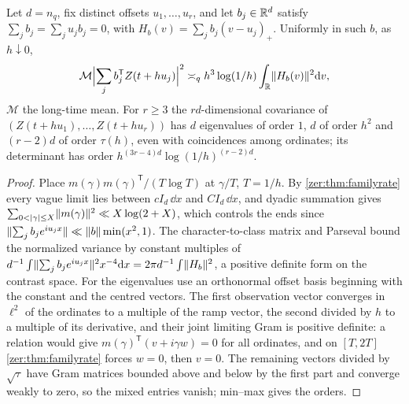 \begin{corollary}\label{zer:cor:classorders}
Let $d=n_q$, fix distinct offsets $u_1,\dots,u_r$, and let $b_j\in\mathbb{R}^d$ satisfy $\sum_jb_j=\sum_ju_jb_j=0$,
with $H_b(v)=\sum_jb_j(v-u_j)_+$. Uniformly in such $b$, as $h\downarrow0$,
\[
 \mathcal M\Bigl\lvert\sum_jb_j^{\mathsf T}Z(t+hu_j)\Bigr\rvert^2\asymp_q h^3\log(1/h)\int_{\mathbb{R}}\lVert H_b(v)\rVert^2\mathrm{d} v ,
\]
$\mathcal M$ the long-time mean. For $r\ge3$ the $rd$-dimensional covariance of
$(Z(t+hu_1),\dots,Z(t+hu_r))$ has $d$ eigenvalues of order $1$, $d$ of order $h^2$ and $(r-2)d$ of order
$\tau(h)$, even with coincidences among ordinates; its determinant has order
$h^{(3r-4)d}\log(1/h)^{(r-2)d}$.
\end{corollary}
\begin{proof}
Place $m(\gamma)m(\gamma)^{\mathsf T}/(T\log T)$ at $\gamma/T$, $T=1/h$. By \cref{zer:thm:familyrate} every vague
limit lies between $cI_d\,\dd x$ and $CI_d\,\dd x$, and dyadic summation gives
$\sum_{0<\lvert\gamma\rvert\le X}\lVert m(\gamma)\rVert^2\ll X\log(2+X)$, which controls the ends since
$\lVert\sum_jb_je^{iu_jx}\rVert\ll\lVert b\rVert\min(x^2,1)$. The character-to-class matrix and Parseval bound the
normalized variance by constant multiples of $d^{-1}\int\lVert\sum_jb_je^{iu_jx}\rVert^2x^{-4}\mathrm{d} x
=2\pi d^{-1}\int\lVert H_b\rVert^2$, a positive definite form on the contrast space. For the eigenvalues use an
orthonormal offset basis beginning with the constant and the centred vectors. The first observation
vector converges in $\ell^2$ of the ordinates to a multiple of the ramp vector, the second divided by
$h$ to a multiple of its derivative, and their joint limiting Gram is positive definite: a relation
would give $m(\gamma)^{\mathsf T}(v+i\gamma w)=0$ for all ordinates, and on $[T,2T]$
\cref{zer:thm:familyrate} forces $w=0$, then $v=0$. The remaining vectors divided by $\sqrt{\tau}$ have
Gram matrices bounded above and below by the first part and converge weakly to zero, so the mixed
entries vanish; min--max gives the orders.
\end{proof}

